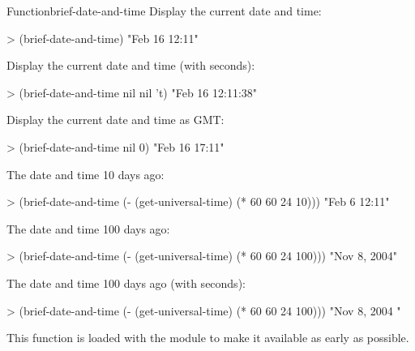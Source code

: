 \documentclass[10pt,twoside,english,pdftex]{article}
\begin{document}
\begin{functiondoc}{Function}{brief-date-and-time}{
    \returns{} }
\fnexamples
Display the current date and time: 
\begin{example}
> (brief-date-and-time)
"Feb 16 12:11"
\end{example}
Display the current date and time (with seconds):
\begin{example}
> (brief-date-and-time nil nil 't)
"Feb 16 12:11:38"
\end{example}
Display the current date and time as GMT: 
\begin{example}
> (brief-date-and-time nil 0)
"Feb 16 17:11"
\end{example}
The date and time 10 days ago:
\begin{example}
> (brief-date-and-time (- (get-universal-time) (* 60 60 24 10)))
"Feb 6 12:11"
\end{example}
The date and time 100 days ago:
\begin{example}
> (brief-date-and-time (- (get-universal-time) (* 60 60 24 100)))
"Nov  8, 2004"
\end{example}
The date and time 100 days ago (with seconds):
\begin{example}
> (brief-date-and-time (- (get-universal-time) (* 60 60 24 100)))
"Nov  8, 2004   "
\end{example}

\fnnotes
{}%
%
This function is loaded with the  module to make it
available as early as possible.

\end{functiondoc}

\end{document}
